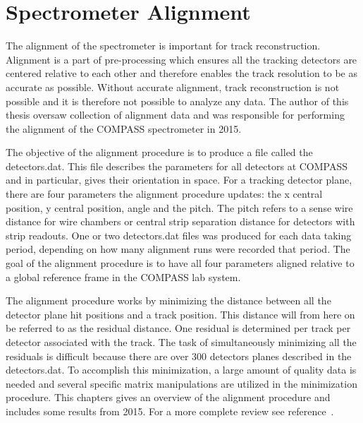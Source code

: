 \chapter{Spectrometer Alignment} \label{ch::alignment}
\ifpdf
\graphicspath{{Chapters/Alignment/Figs/Raster/}{Chapters/Alignment/Figs/PDF/}{Chapters/Alignment/Figs/}}
\else \graphicspath{{Chapters/Alignment/Figs/Vector/}{Chapters/Alignment/Figs/}}
\fi

The alignment of the spectrometer is important for track reconstruction.
Alignment is a part of pre-processing which ensures all the tracking detectors
are centered relative to each other and therefore enables the track resolution
to be as accurate as possible.  Without accurate alignment, track reconstruction
is not possible and it is therefore not possible to analyze any data.  The
author of this thesis oversaw collection of alignment data and was
responsible for performing the alignment of the COMPASS spectrometer in 2015.

The objective of the alignment procedure is to produce a file called the
detectors.dat.  This file describes the parameters for all detectors at COMPASS
and in particular, gives their orientation in space.  For a tracking detector
plane, there are four parameters the alignment procedure updates: the x central
position, y central position, angle and the pitch.  The pitch refers to a sense
wire distance for wire chambers or central strip separation distance for
detectors with strip readouts.  One or two detectors.dat files was produced for
each data taking period, depending on how many alignment runs were recorded that
period.  The goal of the alignment procedure is to have all four parameters
aligned relative to a global reference frame in the COMPASS lab system.

The alignment procedure works by minimizing the distance between all the
detector plane hit positions and a track position.  This distance will from here
on be referred to as the residual distance.  One residual is determined per
track per detector associated with the track.  The task of simultaneously
minimizing all the residuals is difficult because there are over 300
detectors planes described in the detectors.dat.  To accomplish this
minimization, a large amount of quality data is needed and several specific
matrix manipulations are utilized in the minimization
procedure.  This chapters gives an overview of the alignment
procedure and includes some results from 2015.  For a more complete review see
reference~\cite{compassAlignmentNote}.


